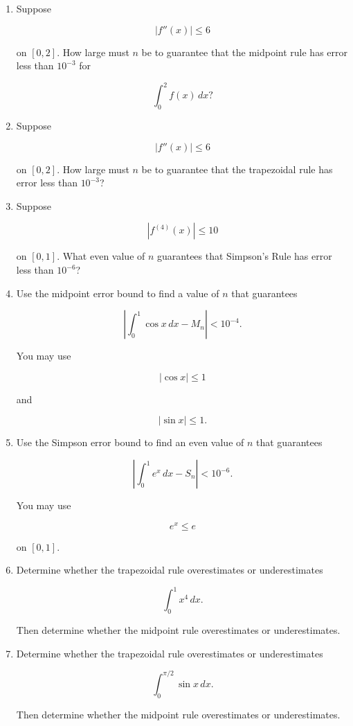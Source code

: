 \begin{enumerate}
Use the trapezoidal rule to estimate displacement from \(t=0\) to \(t=2\).

\item Suppose

\[
|f''(x)|\le 6
\]

on \([0,2]\).  How large must \(n\) be to guarantee that the midpoint rule has error
less than \(10^{-3}\) for

\[
\int_0^2 f(x)\,dx?
\]

\item Suppose

\[
|f''(x)|\le 6
\]

on \([0,2]\).  How large must \(n\) be to guarantee that the trapezoidal rule has error
less than \(10^{-3}\)?

\item Suppose

\[
|f^{(4)}(x)|\le 10
\]

on \([0,1]\).  What even value of \(n\) guarantees that Simpson's Rule has error less
than \(10^{-6}\)?

\item Use the midpoint error bound to find a value of \(n\) that guarantees

\[
\left|
\int_0^1 \cos x\,dx-M_n
\right|
<10^{-4}.
\]

You may use

\[
|\cos x|\le1
\]

and

\[
|\sin x|\le1.
\]

\item Use the Simpson error bound to find an even value of \(n\) that guarantees

\[
\left|
\int_0^1 e^x\,dx-S_n
\right|
<10^{-6}.
\]

You may use

\[
e^x\le e
\]

on \([0,1]\).

\item Determine whether the trapezoidal rule overestimates or underestimates

\[
\int_0^1 x^4\,dx.
\]

Then determine whether the midpoint rule overestimates or underestimates.

\item Determine whether the trapezoidal rule overestimates or underestimates

\[
\int_0^{\pi/2}\sin x\,dx.
\]

Then determine whether the midpoint rule overestimates or underestimates.


\end{enumerate}
